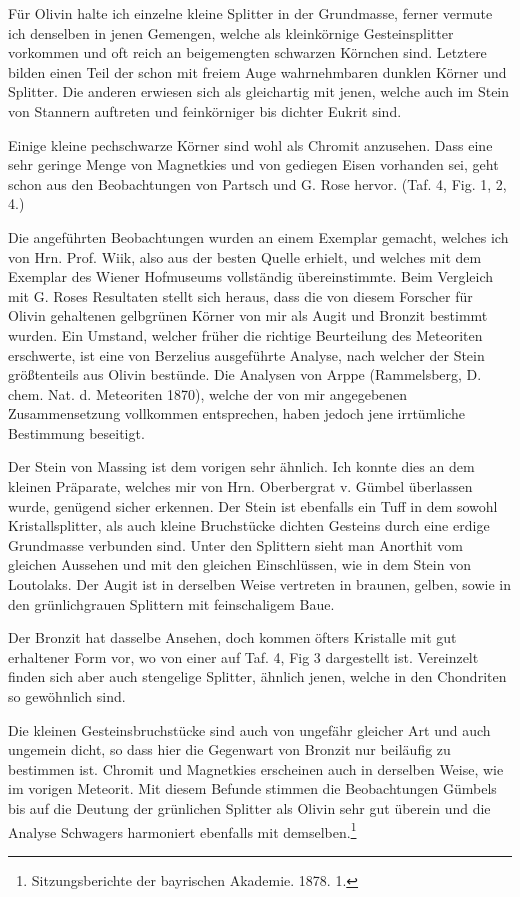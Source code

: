 \documentclass[a4paper, 12pt, oneside]{article}
\begin{document}
Für Olivin halte ich einzelne kleine Splitter in der Grundmasse, ferner vermute ich denselben in jenen Gemengen, welche als kleinkörnige Gesteinsplitter vorkommen und oft reich an beigemengten schwarzen Körnchen sind. Letztere bilden einen Teil der schon mit freiem Auge wahrnehmbaren dunklen Körner und Splitter. Die anderen erwiesen sich als gleichartig mit jenen, welche auch im Stein von Stannern auftreten und feinkörniger bis dichter Eukrit sind.

Einige kleine pechschwarze Körner sind wohl als Chromit anzusehen. Dass eine sehr geringe Menge von Magnetkies und von gediegen Eisen vorhanden sei, geht schon aus den Beobachtungen von Partsch und G. Rose hervor. (Taf. 4, Fig. 1, 2, 4.)

Die angeführten Beobachtungen wurden an einem Exemplar gemacht, welches ich von Hrn. Prof. Wiik, also aus der besten Quelle erhielt, und welches mit dem Exemplar des Wiener Hofmuseums vollständig übereinstimmte. Beim Vergleich mit G. Roses Resultaten stellt sich heraus, dass die von diesem Forscher für Olivin gehaltenen gelbgrünen Körner von mir als Augit und Bronzit bestimmt wurden. Ein Umstand, welcher früher die richtige Beurteilung des Meteoriten erschwerte, ist eine von Berzelius ausgeführte Analyse, nach welcher der Stein größtenteils aus Olivin bestünde. Die Analysen von Arppe (Rammelsberg, D. chem. Nat. d. Meteoriten 1870), welche der von mir angegebenen Zusammensetzung vollkommen entsprechen, haben jedoch jene irrtümliche Bestimmung beseitigt.

Der Stein von Massing ist dem vorigen sehr ähnlich. Ich konnte dies an dem kleinen Präparate, welches mir von Hrn. Oberbergrat v. Gümbel überlassen wurde, genügend sicher erkennen. Der Stein ist ebenfalls ein Tuff in dem sowohl Kristallsplitter, als auch kleine Bruchstücke dichten Gesteins durch eine erdige Grundmasse verbunden sind. Unter den Splittern sieht man Anorthit vom gleichen Aussehen und mit den gleichen Einschlüssen, wie in dem Stein von Loutolaks. Der Augit ist in derselben Weise vertreten in braunen, gelben, sowie in den grünlichgrauen Splittern mit feinschaligem Baue.

Der Bronzit hat dasselbe Ansehen, doch kommen öfters Kristalle mit gut erhaltener Form vor, wo von einer auf Taf. 4, Fig 3 dargestellt ist. Vereinzelt finden sich aber auch stengelige Splitter, ähnlich jenen, welche in den Chondriten so gewöhnlich sind.

Die kleinen Gesteinsbruchstücke sind auch von ungefähr gleicher Art und auch ungemein dicht, so dass hier die Gegenwart von Bronzit nur beiläufig zu bestimmen ist. Chromit und Magnetkies erscheinen auch in derselben Weise, wie im vorigen Meteorit. Mit diesem Befunde stimmen die Beobachtungen Gümbels bis auf die Deutung der grünlichen Splitter als Olivin sehr gut überein und die Analyse Schwagers harmoniert ebenfalls mit demselben.\footnote{Sitzungsberichte der bayrischen Akademie. 1878. 1.}
\end{document}

